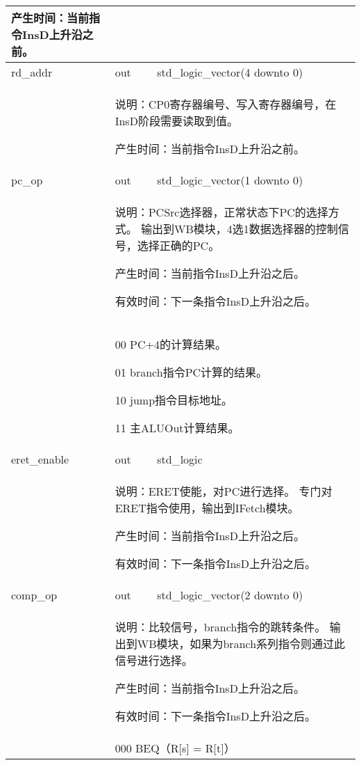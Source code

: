 \begin{tabularx}{\textwidth}{lll}
{                产生时间：当前指令InsD上升沿之前。
            } \\
            \midrule
            rd\_addr        & out       & std\_logic\_vector(4 downto 0) \\
            \cmidrule(l){2-3}
            &
            \multicolumn{2}{X}{
                说明：CP0寄存器编号、写入寄存器编号，在InsD阶段需要读取到值。

                产生时间：当前指令InsD上升沿之前。
            } \\
            \midrule
            pc\_op          & out       & std\_logic\_vector(1 downto 0) \\
            \cmidrule(l){2-3}
            &
            \multicolumn{2}{X}{
                说明：PCSrc选择器，正常状态下PC的选择方式。%
                输出到WB模块，4选1数据选择器的控制信号，选择正确的PC。

                产生时间：当前指令InsD上升沿之后。

                有效时间：下一条指令InsD上升沿之后。 
            } \\
            &
            \multicolumn{2}{X}{
                00 PC+4的计算结果。

                01 branch指令PC计算的结果。

                10 jump指令目标地址。

                11 主ALUOut计算结果。
            } \\
            \midrule
            eret\_enable    & out       & std\_logic \\

            \cmidrule(l){2-3}
            &
            \multicolumn{2}{X}{
                说明：ERET使能，对PC进行选择。%
                专门对ERET指令使用，输出到IFetch模块。

                产生时间：当前指令InsD上升沿之后。

                有效时间：下一条指令InsD上升沿之后。 
            } \\
            \midrule
            comp\_op        & out       & std\_logic\_vector(2 downto 0) \\
            \cmidrule(l){2-3}
            &
            \multicolumn{2}{X}{
                说明：比较信号，branch指令的跳转条件。%
                输出到WB模块，如果为branch系列指令则通过此信号进行选择。

                产生时间：当前指令InsD上升沿之后。

                有效时间：下一条指令InsD上升沿之后。 
            } \\
            &
            \multicolumn{2}{X}{
                000 BEQ（R[s] = R[t]）

}
\end{tabularx}
